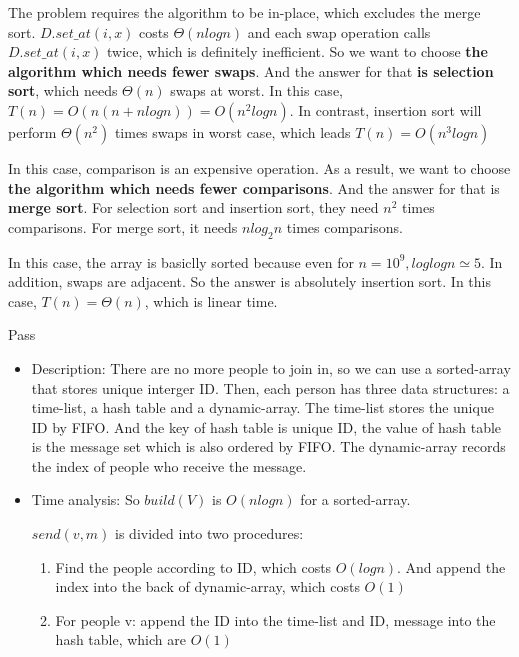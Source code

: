 \documentclass[12pt,twoside]{article}
\begin{document}
\begin{problems}
\begin{problemparts}
\end{problemparts}

\newpage
\problem  %

\begin{problemparts}
\problempart %
The problem requires the algorithm to be in-place, which excludes the merge sort.
$D.set\_at(i, x)$ costs $\Theta(nlogn)$ and each swap operation calls $D.set\_at(i, x)$
twice, which is definitely inefficient. So we want to choose \textbf{the algorithm which 
needs fewer swaps}. And the answer for that \textbf{is selection sort}, which needs $\Theta(n)$
swaps at worst. In this case, $T(n)=O(n(n+nlogn))=O(n^2logn)$. In contrast, insertion
sort will perform $\Theta(n^2)$ times swaps in worst case, which leads $T(n)=O(n^3logn)$

\problempart %
In this case, comparison is an expensive operation. As a result, we want to choose
\textbf{the algorithm which needs fewer comparisons}. And the answer for that is 
\textbf{merge sort}. For selection sort and insertion sort, they need $n^2$ times comparisons.
For merge sort, it needs $nlog_2n$ times comparisons.

\problempart %
In this case, the array is basiclly sorted because even for $n=10^9, loglogn\simeq5$.
In addition, swaps are adjacent. So the answer is absolutely insertion sort.
In this case, $T(n)=\Theta(n)$, which is linear time.

\end{problemparts}

\problem  %
Pass

\problem  %
\begin{itemize}
    \item 
    Description: There are no more people to join in, so we can use a sorted-array that stores
    unique interger ID. Then, each person has three data structures: a time-list, a hash table 
    and a dynamic-array. The time-list stores the unique ID by FIFO. And the key of hash table
    is unique ID, the value of hash table is the message set which is also ordered by FIFO. 
    The dynamic-array records the index of people who receive the message.
    \item
    Time analysis: So $build(V)$ is $O(nlogn)$ for a sorted-array. 
    
    $send(v, m)$ is divided into two procedures:
    \begin{enumerate}
        \item Find the people according to ID, which costs $O(logn)$. And append the index into 
        the back of dynamic-array, which costs $O(1)$
        \item For people v: append the ID into the time-list and {ID, message} into the hash
        table, which are $O(1)$
    \end{enumerate}


\end{itemize}
\end{problems}
\end{document}
